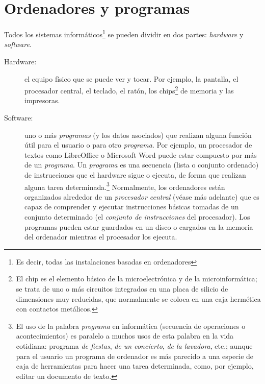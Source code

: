 \chapter{Ordenadores y programas} 

 \label{se:OiP} 

Todos los sistemas informáticos\footnote{Es decir, todas las instalaciones basadas en ordenadores} se pueden dividir en dos partes: \emph{hardware} y \emph{software}. 

\begin{description} \item[Hardware:] el equipo físico que se puede ver y tocar. Por ejemplo, la pantalla, el procesador central, el teclado, el ratón, los chips\footnote{El chip es el elemento básico de la microelectrónica y de la microinformática; se trata de uno o más circuitos integrados en una placa de silicio de dimensiones muy reducidas, que normalmente se coloca en una caja hermética con contactos metálicos.} de memoria y las impresoras. 

\item[Software:] uno o más \emph{programas} (y los datos asociados) que realizan alguna función útil para el usuario o para otro \emph{programa}. Por ejemplo, un procesador de textos como LibreOffice o Microsoft Word puede estar compuesto por más de un \emph{programa}. Un \emph{programa} es una secuencia (lista o conjunto ordenado) de instrucciones que el hardware sigue o ejecuta, de forma que realizan alguna tarea determinada.\footnote{El uso de la palabra \emph{programa} en informática (secuencia de operaciones o acontecimientos) es paralelo a muchos usos de esta palabra en la vida cotidiana: programa \emph{de fiestas}, \emph{de un concierto}, \emph{de la lavadora}, etc.; aunque para el usuario un programa de ordenador es más parecido a una especie de caja de herramientas para hacer una tarea determinada, como, por ejemplo, editar un documento de texto.} Normalmente, los ordenadores están organizados alrededor de un \emph{procesador central} (véase más adelante) que es capaz de comprender y ejecutar instrucciones básicas tomadas de un conjunto determinado (el \emph{conjunto de instrucciones} del procesador). Los programas pueden estar guardados en un disco o cargados en la memoria del ordenador mientras el procesador los ejecuta. \end{description} 

